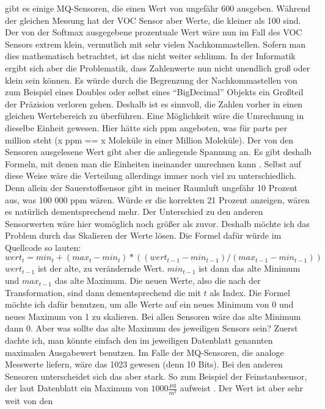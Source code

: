 \documentclass[10pt]{article}
\begin{document}
gibt es einige MQ-Sensoren, die einen Wert von ungefähr 600 ausgeben. Während der gleichen Messung hat der VOC Sensor aber Werte, die kleiner als 100 sind. Der von der Softmax ausgegebene
prozentuale Wert wäre nun im Fall des VOC Sensors extrem klein, vermutlich mit sehr vielen Nachkommastellen. Sofern man dies mathematisch betrachtet, ist das nicht weiter schlimm. 
In der Informatik ergibt sich aber die Problematik, dass Zahlenwerte nun nicht unendlich groß oder klein sein können. Es würde durch die Begrenzung der Nachkommastellen von zum Beispiel eines Doubles oder selbst eines "`BigDecimal"' Objekts ein Großteil der Präzision verloren gehen. Deshalb ist es sinnvoll, die Zahlen vorher in einen gleichen Wertebereich zu überführen. 
Eine Möglichkeit wäre die Umrechnung in dieselbe Einheit gewesen. Hier hätte sich ppm angeboten, was für parts per million steht (x ppm == x Moleküle in einer Million Moleküle).
Der von den Sensoren ausgelesene Wert gibt aber die anliegende Spannung an. Es gibt deshalb Formeln, mit denen man die Einheiten ineinander umrechnen kann \autocite{MQToPPM}. Selbst auf
diese Weise wäre die Verteilung allerdings immer noch viel zu unterschiedlich. Denn allein der Sauerstoffsensor gibt in meiner Raumluft ungefähr 10 Prozent aus,
was 100 000 ppm wären. Würde er die korrekten 21 Prozent anzeigen, wären es natürlich dementsprechend mehr. Der Unterschied zu den anderen Sensorwerten wäre hier womöglich noch größer als zuvor. 
Deshalb möchte ich das Problem durch das Skalieren der Werte lösen.
Die Formel dafür würde im Quellcode so lauten:\\
$$ wert_{t} = min_{t} + (max_{t} - min_{t}) * ((wert_{t-1} - min_{t-1}) / (max_{t-1} - min_{t-1}))$$
$wert_{t-1}$ ist der alte, zu verändernde Wert. $min_{t-1}$ ist dann das alte Minimum und $max_{t-1}$ das alte Maximum. Die neuen Werte, also die nach der Transformation, 
sind dann dementsprechend die mit $t$ als Index. Die Formel möchte ich dafür benutzen, um alle Werte auf ein neues Minimum von 0 und neues Maximum von 1 zu skalieren.
Bei allen Sensoren wäre das alte Minimum dann 0. Aber was sollte das alte Maximum des jeweiligen Sensors sein? Zuerst dachte ich, man könnte einfach
den im jeweiligen Datenblatt genannten maximalen Ausgabewert benutzen. Im Falle der MQ-Sensoren, die analoge Messwerte liefern, wäre das 1023 gewesen (denn 10 Bits).
Bei den anderen Sensoren unterscheidet sich das aber stark.
So zum Beispiel der Feinstaubsensor, der laut Datenblatt ein Maximum von $1000 \frac{\mu g}{m^3}$ aufweist \autocite{Staubsensor}. Der Wert ist aber sehr weit von den 
\end{document}

